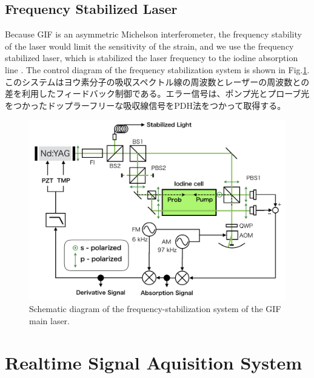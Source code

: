 \subsection{Frequency Stabilized Laser}
Because GIF is an asymmetric Michelson interferometer, the frequency stability of the laser would limit the sensitivity of the strain, and we use the frequency stabilized laser, which is stabilized the laser frequency to the iodine absorption line \cite{araya2002iodine}. The control diagram of the frequency stabilization system is shown in Fig.\ref{img:img417}. このシステムはヨウ素分子の吸収スペクトル線の周波数とレーザーの周波数との差を利用したフィードバック制御である。エラー信号は、ポンプ光とプローブ光をつかったドップラーフリーな吸収線信号\cite{snyder1980high}をPDH法をつかって取得する。

\begin{figure}[h]
  \begin{center}   
    \includegraphics[width=12cm]{./img_chap4/img417.png}
    \caption{Schematic diagram of the frequency-stabilization system of the GIF main laser.}\label{img:img417}
  \end{center}
\end{figure}

\section{Realtime Signal  Aquisition System} \label{sec:sec44}



